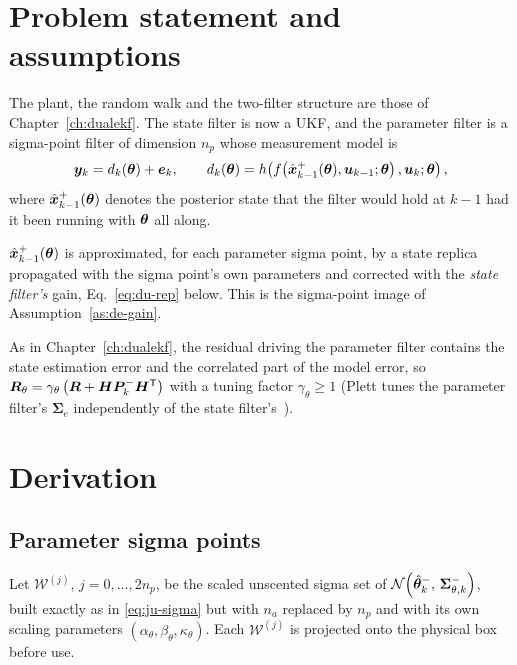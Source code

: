\section{Problem statement and assumptions}
The plant, the random walk and the two-filter structure are those of Chapter~\ref{ch:dualekf}.  The
state filter is now a UKF, and the parameter filter is a sigma-point filter of dimension $n_p$ whose
measurement model is
\begin{equation}
\bm{y}_k = d_k(\bm{\theta})+\bm{e}_k, \qquad
d_k(\bm{\theta})=h\!\left(f\!\left(\hat{\bm{x}}^{+}_{k-1}(\bm{\theta}),\bm{u}_{k-1};\bm{\theta}\right),\bm{u}_k;\bm{\theta}\right),
\label{eq:du-meas}
\end{equation}
where $\hat{\bm{x}}^{+}_{k-1}(\bm{\theta})$ denotes the posterior state that the filter would hold at $k-1$ had it
been running with $\bm{\theta}$ all along.

\begin{assumption}\label{as:du-rep}
$\hat{\bm{x}}^{+}_{k-1}(\bm{\theta})$ is approximated, for each parameter sigma point, by a state replica
propagated with the sigma point's own parameters and corrected with the \emph{state filter's} gain,
Eq.~\eqref{eq:du-rep} below.  This is the sigma-point image of Assumption~\ref{as:de-gain}.
\end{assumption}

\begin{assumption}\label{as:du-R}
As in Chapter~\ref{ch:dualekf}, the residual driving the parameter filter contains the state
estimation error and the correlated part of the model error, so
$\bm{R}_\theta=\gamma_\theta\left(\bm{R}+\bm{H}\bm{P}^-_k\bm{H}^{\mathsf{T}}\right)$ with a tuning factor
$\gamma_\theta\ge1$ (Plett tunes the parameter filter's $\bm{\Sigma}_e$ independently of the state
filter's~\cite[§5]{plett2006spkf2}).
\end{assumption}

\section{Derivation}

\subsection{Parameter sigma points}
Let $\bm{\mathcal{W}}^{(j)}$, $j=0,\dots,2n_p$, be the scaled unscented sigma set of
$\mathcal{N}\!\left(\hat{\bm{\theta}}^-_k,\,\bm{\Sigma}^-_{\theta,k}\right)$, built exactly as in \eqref{eq:ju-sigma} but with
$n_a$ replaced by $n_p$ and with its own scaling parameters
$(\alpha_\theta,\beta_\theta,\kappa_\theta)$.  Each $\bm{\mathcal{W}}^{(j)}$ is projected onto the
physical box before use.


